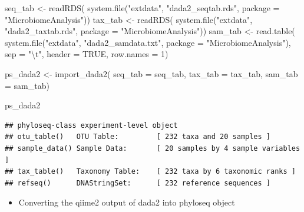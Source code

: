 \documentclass[
]{book}
\newenvironment{Shaded}{\begin{snugshade}}{\end{snugshade}}
\newcommand{\AttributeTok}[1]{\textcolor[rgb]{0.77,0.63,0.00}{#1}}
\newcommand{\ConstantTok}[1]{\textcolor[rgb]{0.00,0.00,0.00}{#1}}
\newcommand{\DecValTok}[1]{\textcolor[rgb]{0.00,0.00,0.81}{#1}}
\newcommand{\FunctionTok}[1]{\textcolor[rgb]{0.00,0.00,0.00}{#1}}
\newcommand{\NormalTok}[1]{#1}
\newcommand{\OtherTok}[1]{\textcolor[rgb]{0.56,0.35,0.01}{#1}}
\newcommand{\SpecialCharTok}[1]{\textcolor[rgb]{0.00,0.00,0.00}{#1}}
\newcommand{\StringTok}[1]{\textcolor[rgb]{0.31,0.60,0.02}{#1}}
\providecommand{\tightlist}{%
  \setlength{\itemsep}{0pt}\setlength{\parskip}{0pt}}
\begin{document}
\begin{Shaded}
\begin{Highlighting}[]
\NormalTok{seq\_tab }\OtherTok{\textless{}{-}} \FunctionTok{readRDS}\NormalTok{(}
  \FunctionTok{system.file}\NormalTok{(}\StringTok{"extdata"}\NormalTok{, }\StringTok{"dada2\_seqtab.rds"}\NormalTok{,}
              \AttributeTok{package =} \StringTok{"MicrobiomeAnalysis"}\NormalTok{))}
\NormalTok{tax\_tab }\OtherTok{\textless{}{-}} \FunctionTok{readRDS}\NormalTok{(}
  \FunctionTok{system.file}\NormalTok{(}\StringTok{"extdata"}\NormalTok{, }\StringTok{"dada2\_taxtab.rds"}\NormalTok{,}
              \AttributeTok{package =} \StringTok{"MicrobiomeAnalysis"}\NormalTok{))}
\NormalTok{sam\_tab }\OtherTok{\textless{}{-}} \FunctionTok{read.table}\NormalTok{(}
  \FunctionTok{system.file}\NormalTok{(}\StringTok{"extdata"}\NormalTok{, }\StringTok{"dada2\_samdata.txt"}\NormalTok{,}
              \AttributeTok{package =} \StringTok{"MicrobiomeAnalysis"}\NormalTok{),}
  \AttributeTok{sep =} \StringTok{"}\SpecialCharTok{\textbackslash{}t}\StringTok{"}\NormalTok{, }\AttributeTok{header =} \ConstantTok{TRUE}\NormalTok{, }\AttributeTok{row.names =} \DecValTok{1}\NormalTok{)}

\NormalTok{ps\_dada2 }\OtherTok{\textless{}{-}} \FunctionTok{import\_dada2}\NormalTok{(}
   \AttributeTok{seq\_tab =}\NormalTok{ seq\_tab,}
   \AttributeTok{tax\_tab =}\NormalTok{ tax\_tab,}
   \AttributeTok{sam\_tab =}\NormalTok{ sam\_tab)}

\NormalTok{ps\_dada2}
\end{Highlighting}
\end{Shaded}

\begin{verbatim}
## phyloseq-class experiment-level object
## otu_table()   OTU Table:         [ 232 taxa and 20 samples ]
## sample_data() Sample Data:       [ 20 samples by 4 sample variables ]
## tax_table()   Taxonomy Table:    [ 232 taxa by 6 taxonomic ranks ]
## refseq()      DNAStringSet:      [ 232 reference sequences ]
\end{verbatim}

\begin{itemize}
\tightlist
\item
  Converting the qiime2 output of dada2 into phyloseq object
\end{itemize}
\end{document}
